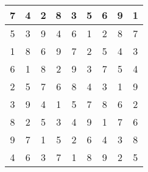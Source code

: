 \documentclass[]{article}
\begin{document}
\begin{table}[]
\begin{tabular}{c|c|c|c|c|c|c|c|c}
7 & 4 & 2 & 8 & 3 & 5 & 6 & 9 & 1 \\\hline
5 & 3 & 9 & 4 & 6 & 1 & 2 & 8 & 7 \\\hline
1 & 8 & 6 & 9 & 7 & 2 & 5 & 4 & 3 \\\hline
6 & 1 & 8 & 2 & 9 & 3 & 7 & 5 & 4 \\\hline
2 & 5 & 7 & 6 & 8 & 4 & 3 & 1 & 9 \\\hline
3 & 9 & 4 & 1 & 5 & 7 & 8 & 6 & 2 \\\hline
8 & 2 & 5 & 3 & 4 & 9 & 1 & 7 & 6 \\\hline
9 & 7 & 1 & 5 & 2 & 6 & 4 & 3 & 8 \\\hline
4 & 6 & 3 & 7 & 1 & 8 & 9 & 2 & 5
\end{tabular}
\end{table}
\end{document}
